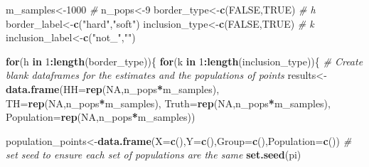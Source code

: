 \documentclass[
]{article}
\newenvironment{Shaded}{\begin{snugshade}}{\end{snugshade}}
\newcommand{\AttributeTok}[1]{\textcolor[rgb]{0.13,0.29,0.53}{#1}}
\newcommand{\CommentTok}[1]{\textcolor[rgb]{0.56,0.35,0.01}{\textit{#1}}}
\newcommand{\ConstantTok}[1]{\textcolor[rgb]{0.56,0.35,0.01}{#1}}
\newcommand{\ControlFlowTok}[1]{\textcolor[rgb]{0.13,0.29,0.53}{\textbf{#1}}}
\newcommand{\DecValTok}[1]{\textcolor[rgb]{0.00,0.00,0.81}{#1}}
\newcommand{\FunctionTok}[1]{\textcolor[rgb]{0.13,0.29,0.53}{\textbf{#1}}}
\newcommand{\NormalTok}[1]{#1}
\newcommand{\OtherTok}[1]{\textcolor[rgb]{0.56,0.35,0.01}{#1}}
\newcommand{\SpecialCharTok}[1]{\textcolor[rgb]{0.81,0.36,0.00}{\textbf{#1}}}
\newcommand{\StringTok}[1]{\textcolor[rgb]{0.31,0.60,0.02}{#1}}
\begin{document}
\begin{Shaded}
\begin{Highlighting}[]
\NormalTok{m\_samples}\OtherTok{\textless{}{-}}\DecValTok{1000} \CommentTok{\#}
\NormalTok{n\_pops}\OtherTok{\textless{}{-}}\DecValTok{9}
\NormalTok{border\_type}\OtherTok{\textless{}{-}}\FunctionTok{c}\NormalTok{(}\ConstantTok{FALSE}\NormalTok{,}\ConstantTok{TRUE}\NormalTok{) }\CommentTok{\# h}
\NormalTok{border\_label}\OtherTok{\textless{}{-}}\FunctionTok{c}\NormalTok{(}\StringTok{"hard"}\NormalTok{,}\StringTok{"soft"}\NormalTok{)}
\NormalTok{inclusion\_type}\OtherTok{\textless{}{-}}\FunctionTok{c}\NormalTok{(}\ConstantTok{FALSE}\NormalTok{,}\ConstantTok{TRUE}\NormalTok{) }\CommentTok{\# k}
\NormalTok{inclusion\_label}\OtherTok{\textless{}{-}}\FunctionTok{c}\NormalTok{(}\StringTok{"not\_"}\NormalTok{,}\StringTok{""}\NormalTok{)}

\ControlFlowTok{for}\NormalTok{(h }\ControlFlowTok{in} \DecValTok{1}\SpecialCharTok{:}\FunctionTok{length}\NormalTok{(border\_type))\{}
  \ControlFlowTok{for}\NormalTok{(k }\ControlFlowTok{in} \DecValTok{1}\SpecialCharTok{:}\FunctionTok{length}\NormalTok{(inclusion\_type))\{}
    \CommentTok{\# Create blank dataframes for the estimates and the populations of points}
\NormalTok{    results}\OtherTok{\textless{}{-}}\FunctionTok{data.frame}\NormalTok{(}\AttributeTok{HH=}\FunctionTok{rep}\NormalTok{(}\ConstantTok{NA}\NormalTok{,n\_pops}\SpecialCharTok{*}\NormalTok{m\_samples),}
                        \AttributeTok{TH=}\FunctionTok{rep}\NormalTok{(}\ConstantTok{NA}\NormalTok{,n\_pops}\SpecialCharTok{*}\NormalTok{m\_samples),}
                        \AttributeTok{Truth=}\FunctionTok{rep}\NormalTok{(}\ConstantTok{NA}\NormalTok{,n\_pops}\SpecialCharTok{*}\NormalTok{m\_samples),}
                        \AttributeTok{Population=}\FunctionTok{rep}\NormalTok{(}\ConstantTok{NA}\NormalTok{,n\_pops}\SpecialCharTok{*}\NormalTok{m\_samples))}
    
\NormalTok{    population\_points}\OtherTok{\textless{}{-}}\FunctionTok{data.frame}\NormalTok{(}\AttributeTok{X=}\FunctionTok{c}\NormalTok{(),}\AttributeTok{Y=}\FunctionTok{c}\NormalTok{(),}\AttributeTok{Group=}\FunctionTok{c}\NormalTok{(),}\AttributeTok{Population=}\FunctionTok{c}\NormalTok{())}
    \CommentTok{\# set seed to ensure each set of populations are the same}
    \FunctionTok{set.seed}\NormalTok{(pi)}
    

\end{Highlighting}
\end{Shaded}
\end{document}
